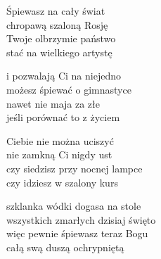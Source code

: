 \begin{text}
    Śpiewasz na cały świat\\
    chropawą szaloną Rosję\\
    Twoje olbrzymie państwo\\
    stać na wielkiego artystę

    i pozwalają Ci na niejedno\\
    możesz śpiewać o gimnastyce\\
    nawet nie maja za złe\\
    jeśli porównać to z życiem

    Ciebie nie można uciszyć\\
    nie zamkną Ci nigdy ust\\
    czy siedzisz przy nocnej lampce\\
    czy idziesz w szalony kurs

    szklanka wódki dogasa na stole\\
    wszystkich zmarłych dzisiaj święto\\
    więc pewnie śpiewasz teraz Bogu\\
    całą swą duszą ochrypniętą
\end{text}
\begin{chord}

\end{chord}